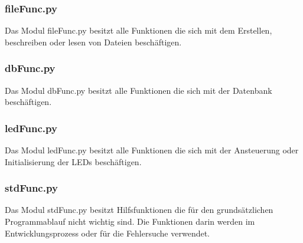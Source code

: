 \subsubsection*{fileFunc.py}
Das Modul fileFunc.py besitzt alle Funktionen die sich mit dem Erstellen, beschreiben oder lesen von Dateien beschäftigen.

\subsubsection*{dbFunc.py}
Das Modul dbFunc.py besitzt alle Funktionen die sich mit der Datenbank beschäftigen.

\subsubsection*{ledFunc.py}
Das Modul ledFunc.py besitzt alle Funktionen die sich mit der Ansteuerung oder Initialisierung der LEDs beschäftigen.

\subsubsection*{stdFunc.py}
Das Modul stdFunc.py besitzt Hilfsfunktionen die für den grundsätzlichen Programmablauf nicht wichtig sind. Die Funktionen darin werden im Entwicklungsprozess oder für die Fehlersuche verwendet.

